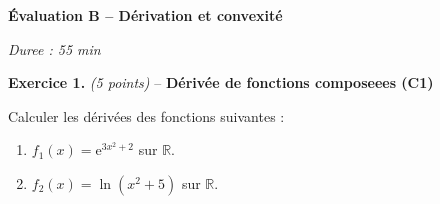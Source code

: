 %
%
%
%
% 

\textbf{Évaluation B -- Dérivation et convexité}

\begin{center}
\textit{Duree : 55 min}
\end{center}

\textbf{Exercice 1.} \textit{(5 points)} -- \textbf{Dérivée de fonctions composeees (C1)}

Calculer les dérivées des fonctions suivantes :
\begin{enumerate}
  \item $f_1(x) = \mathrm{e}^{3x^2 + 2}$ sur $\mathbb{R}$.
  \item $f_2(x) = \ln(x^2 + 5)$ sur $\mathbb{R}$.
\end{enumerate}

\bigskip

